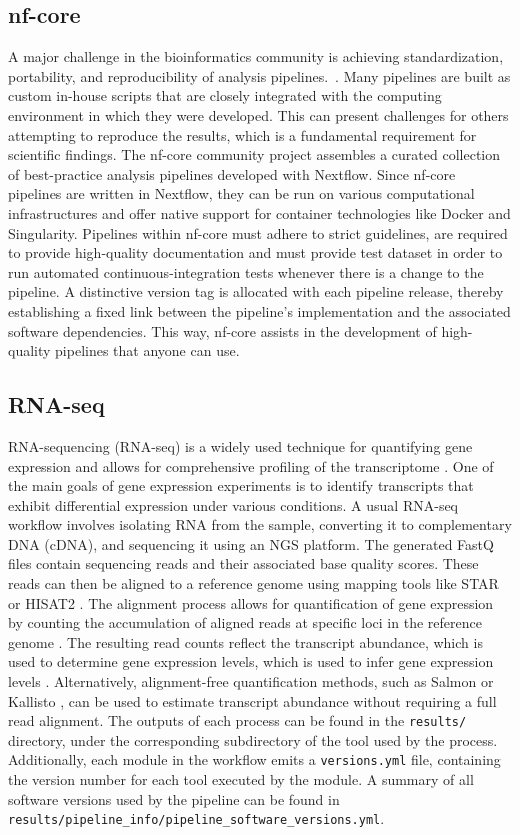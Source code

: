 \documentclass{article}
\theoremstyle{plain}
\theoremstyle{definition}
\theoremstyle{remark}
\begin{document}
\subsection{nf-core}
A major challenge in the bioinformatics community is achieving standardization, portability, and reproducibility of analysis pipelines.~\cite{ewels2020nf}. Many pipelines are built as custom in-house scripts that are closely integrated with the computing environment in which they were developed. This can present challenges for others attempting to reproduce the results, which is a fundamental requirement for scientific findings. The nf-core community project assembles a curated collection of best-practice analysis pipelines developed with Nextflow. Since nf-core pipelines are written in Nextflow, they can be run on various computational infrastructures and offer native support for container technologies like Docker and Singularity. Pipelines within nf-core must adhere to strict guidelines, are required to provide high-quality documentation and must provide test dataset in order to run automated continuous-integration tests whenever there is a change to the pipeline. A distinctive version tag is allocated with each pipeline release, thereby establishing a fixed link between the pipeline's implementation and the associated software dependencies. This way, nf-core assists in the development of high-quality pipelines that anyone can use.
\subsection{RNA-seq}
RNA-sequencing (RNA-seq) is a widely used technique for quantifying gene expression and allows for comprehensive profiling of the transcriptome \cite{Kukurba2015}.
One of the main goals of gene expression experiments is to identify transcripts that exhibit differential expression under various conditions.
A usual RNA-seq workflow involves isolating RNA from the sample, converting it to complementary DNA (cDNA), and sequencing it using an NGS platform.
The generated FastQ files contain sequencing reads and their associated base quality scores. These reads can then be aligned to a reference genome using mapping tools like STAR \cite{Dobin2012} or HISAT2 \cite{Kim2019}.
The alignment process allows for quantification of gene expression by counting the accumulation of aligned reads at specific loci in the reference genome \cite{Kukurba2015}. The resulting read counts reflect the transcript abundance, which is used to determine gene expression levels, which is used to infer gene expression levels \cite{Kukurba2015}.
Alternatively, alignment-free quantification methods, such as Salmon \cite{Patro2017} or Kallisto \cite{Bray2016}, can be used to estimate transcript abundance without requiring a full read alignment.
The outputs of each process can be found in the \verb|results/| directory, under the corresponding subdirectory of the tool used by the process.
Additionally, each module in the workflow emits a \verb|versions.yml| file, containing the version number for each tool executed by the module. A summary of all software versions used by the pipeline can be found in \verb|results/pipeline_info/pipeline_software_versions.yml|.
\end{document}
